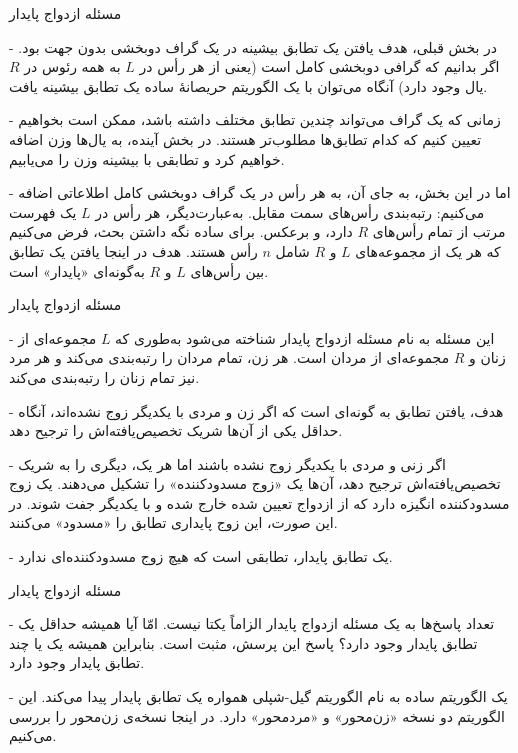 \begin{itemframe}{مسئله ازدواج پایدار}
\item[-]
در بخش قبلی، هدف یافتن یک تطابق بیشینه در یک گراف دوبخشی بدون جهت بود.
اگر بدانیم که گرافی دوبخشی کامل است (یعنی از هر رأس در $L$ به همه رئوس در $R$ یال وجود دارد) آنگاه می‌توان با یک الگوریتم حریصانهٔ ساده یک تطابق بیشینه یافت.
\item[-]
زمانی که یک گراف می‌تواند چندین تطابق مختلف داشته باشد، ممکن است بخواهیم تعیین کنیم که کدام تطابق‌ها مطلوب‌تر هستند. در بخش آینده، به یال‌ها وزن اضافه خواهیم کرد و تطابقی با بیشینه وزن را می‌یابیم.
\item[-]
اما در این بخش، به جای آن، به هر رأس در یک گراف دوبخشی کامل اطلاعاتی اضافه می‌کنیم: رتبه‌بندی رأس‌های سمت مقابل. به‌عبارت‌دیگر، هر رأس در $L$ یک فهرست مرتب از تمام رأس‌های $R$ دارد، و برعکس. برای ساده نگه داشتن بحث، فرض می‌کنیم که هر یک از مجموعه‌های $L$ و $R$ شامل $n$ رأس هستند. هدف در اینجا یافتن یک تطابق بین رأس‌های $L$ و $R$ به‌گونه‌ای «پایدار» است.
\end{itemframe}


\begin{itemframe}{مسئله ازدواج پایدار}
\item[-]
این مسئله به نام مسئله ازدواج پایدار
شناخته می‌شود به‌طوری که $L$ مجموعه‌ای از زنان و $R$ مجموعه‌ای از مردان است. هر زن، تمام مردان را  رتبه‌بندی می‌کند و هر مرد نیز تمام زنان را رتبه‌بندی می‌کند.
\item[-]
هدف، یافتن تطابق به گونه‌ای است که اگر زن و مردی با یکدیگر زوج نشده‌اند، آنگاه حداقل یکی از آن‌ها شریک تخصیص‌یافته‌اش را ترجیح دهد.
\item[-]
اگر زنی و مردی با یکدیگر زوج نشده باشند اما هر یک، دیگری را به شریک تخصیص‌یافته‌اش ترجیح دهد، آن‌ها یک «زوج مسدودکننده»
را تشکیل می‌دهند. یک زوج مسدودکننده انگیزه دارد که از ازدواج تعیین شده خارج شده و با یکدیگر جفت شوند. در این صورت، این زوج پایداری تطابق را «مسدود» می‌کنند.
\item[-]
یک تطابق پایدار، تطابقی است که هیچ زوج مسدودکننده‌ای ندارد.
\end{itemframe}


\begin{itemframe}{مسئله ازدواج پایدار}
\item[-]
تعداد پاسخ‌ها به یک مسئله ازدواج پایدار الزاماً یکتا نیست. امّا آیا همیشه حداقل یک تطابق پایدار وجود دارد؟ پاسخ این پرسش، مثبت است. بنابراین همیشه یک یا چند تطابق پایدار وجود دارد.

\item[-]
یک الگوریتم ساده به نام الگوریتم گیل-شپلی
همواره یک تطابق پایدار پیدا می‌کند. این الگوریتم دو نسخه «زن‌محور»
و «مرد‌محور»
دارد. در اینجا نسخه‌ی زن‌محور را بررسی می‌کنیم.

\end{itemframe}


